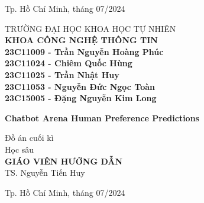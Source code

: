 \begin{titlepage}
\begin{center}
\vfill
Tp. Hồ Chí Minh, tháng 07/2024

\end{center}

\pagebreak



\begin{center}

TRƯỜNG ĐẠI HỌC KHOA HỌC TỰ NHIÊN\\
\textbf{KHOA CÔNG NGHỆ THÔNG TIN}\\[2cm]

{\large \bfseries     23C11009 - Trần Nguyễn Hoàng Phúc \\
    23C11024 - Chiêm Quốc Hùng \\
    23C11025 - Trần Nhật Huy \\
    23C11053 - Nguyễn Đức Ngọc Toàn \\
    23C15005 - Đặng Nguyễn Kim Long \\
[2cm]} 


{ \Large \bfseries Chatbot Arena Human Preference Predictions \\[2cm]}


\large Đồ án cuối kì\\
\large Học sâu\\[2cm]

\textbf{GIÁO VIÊN HƯỚNG DẪN}\\
TS. Nguyễn Tiến Huy  \\


\vfill
Tp. Hồ Chí Minh, tháng 07/2024

\end{center}
\end{titlepage}
